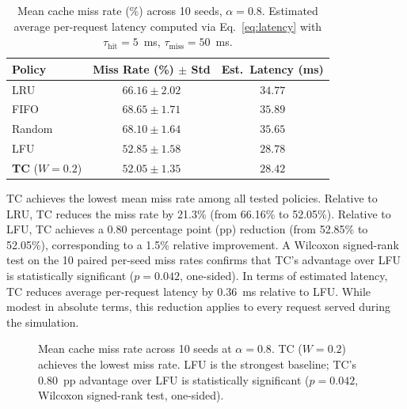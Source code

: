 \documentclass[preprint,12pt]{elsarticle}
\begin{document}
	\begin{table}[t]
		\centering
		\renewcommand{\arraystretch}{1.1}
		\caption{Mean cache miss rate (\%) across 10 seeds, $\alpha = 0.8$. Estimated average per-request latency computed via Eq.~\ref{eq:latency} with $\tau_\text{hit} = 5$~ms, $\tau_\text{miss} = 50$~ms.}
		\label{tab:main}
		\begin{tabular}{lcc}
			\toprule
			\textbf{Policy} & \textbf{Miss Rate (\%) $\pm$ Std} & \textbf{Est.\ Latency (ms)} \\
			\midrule
			LRU & $66.16 \pm 2.02$ & $34.77$ \\
			FIFO & $68.65 \pm 1.71$ & $35.89$ \\
			Random & $68.10 \pm 1.64$ & $35.65$ \\
			LFU & $52.85 \pm 1.58$ & $28.78$ \\
			\textbf{TC} ($W=0.2$) & $\mathbf{52.05 \pm 1.35}$ & $\mathbf{28.42}$ \\
			\bottomrule
		\end{tabular}
	\end{table}
	
	TC achieves the lowest mean miss rate among all tested policies. Relative to LRU, TC reduces the miss rate by 21.3\% (from 66.16\% to 52.05\%). Relative to LFU, TC achieves a 0.80 percentage point (pp) reduction (from 52.85\% to 52.05\%), corresponding to a 1.5\% relative improvement. A Wilcoxon signed-rank test on the 10 paired per-seed miss rates confirms that TC's advantage over LFU is statistically significant ($p = 0.042$, one-sided). In terms of estimated latency, TC reduces average per-request latency by 0.36~ms relative to LFU. While modest in absolute terms, this reduction applies to every request served during the simulation.
	
	\begin{figure}[t]
		\centering
		\caption{Mean cache miss rate across 10 seeds at $\alpha=0.8$. TC ($W=0.2$) achieves the lowest miss rate. LFU is the strongest baseline; TC's 0.80~pp advantage over LFU is statistically significant ($p=0.042$, Wilcoxon signed-rank test, one-sided).}
		\label{fig:miss_bar}
	\end{figure}
	
\end{document}
